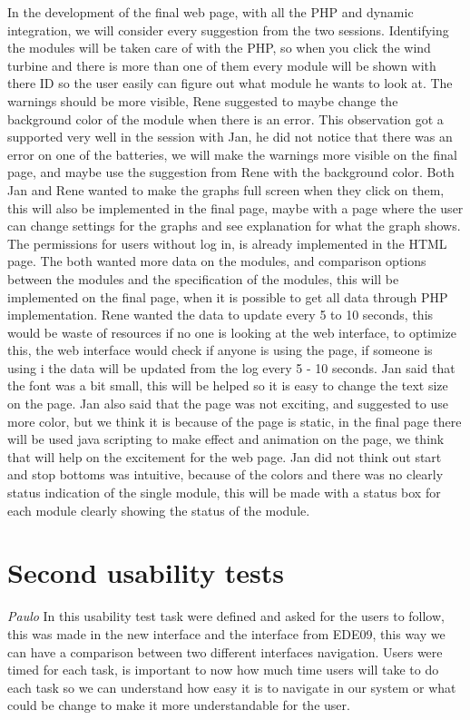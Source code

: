 In the development of the final web page, with all the PHP and dynamic integration, we will consider every suggestion from the two sessions. Identifying the modules will be taken care of with the PHP, so when you click the wind turbine and there is more than one of them every module will be shown with there ID so the user easily can figure out what module he wants to look at. The warnings should be more visible, Rene suggested to maybe change the background color of the module when there is an error. This observation got a supported very well in the session with Jan, he did not notice that there was an error on one of the batteries, we will make the warnings more visible on the final page, and maybe use the suggestion from Rene with the background color. Both Jan and Rene wanted to make the graphs full screen when they click on them, this will also be implemented in the final page, maybe with a page where the user can change settings for the graphs and see explanation for what the graph shows. The permissions for users without log in, is already implemented in the HTML page. The both wanted more data on the modules, and comparison options between the modules and the specification of the modules, this will be implemented on the final page, when it is possible to get all data through PHP implementation. Rene wanted the data to update every 5 to 10 seconds, this would be waste of resources if no one is looking at the web interface, to optimize this, the web interface would check if anyone is using the page, if someone is using i the data will be updated from the log every 5 - 10 seconds. Jan said that the font was a bit small, this will be helped so it is easy to change the text size on the page. Jan also said that the page was not exciting, and suggested to use more color, but we think it is because of the page is static, in the final page there will be used java scripting to make effect and animation on the page, we think that will help on the excitement for the web page. Jan did not think out start and stop bottoms was intuitive, because of the colors and there was no clearly status indication of the single module, this will be made with a status box for each module clearly showing the status of the module.


\section{Second usability tests}
\textit{Paulo}
In this usability test task were defined and asked for the users to follow, this was made in the new interface and the interface from EDE09, this way we can have a comparison between two different interfaces navigation. Users were timed for each task, is important to now how much time users will take to do each task so we can understand how easy it is to navigate in our system or what could be change to make it more understandable for the user.

